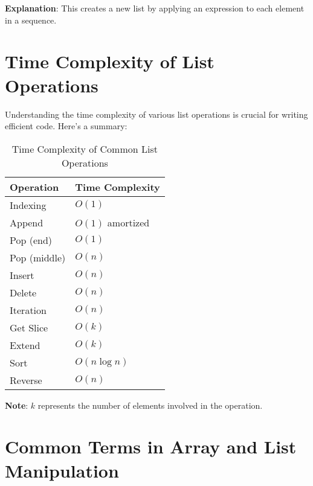 \textbf{Explanation}: This creates a new list by applying an expression to each element in a sequence.

\section{Time Complexity of List Operations}\label{sec:list_time_complexity}

Understanding the time complexity of various list operations is crucial for writing efficient code. Here's a summary:

\begin{table}[h]
    \centering
    \begin{tabular}{|l|l|}
        \hline
        \textbf{Operation} & \textbf{Time Complexity} \\ \hline
        Indexing           & \(O(1)\)                 \\ \hline
        Append             & \(O(1)\) amortized       \\ \hline
        Pop (end)          & \(O(1)\)                 \\ \hline
        Pop (middle)       & \(O(n)\)                 \\ \hline
        Insert             & \(O(n)\)                 \\ \hline
        Delete             & \(O(n)\)                 \\ \hline
        Iteration          & \(O(n)\)                 \\ \hline
        Get Slice          & \(O(k)\)                 \\ \hline
        Extend             & \(O(k)\)                 \\ \hline
        Sort               & \(O(n \log n)\)          \\ \hline
        Reverse            & \(O(n)\)                 \\ \hline
    \end{tabular}
    \caption{Time Complexity of Common List Operations}
    \label{tab:list_time_complexity}
\end{table}

\textbf{Note}: \(k\) represents the number of elements involved in the operation.

\section{Common Terms in Array and List Manipulation}\label{sec:common_terms}

